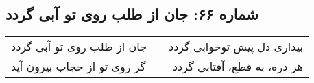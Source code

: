 \begin{center}
\section*{شماره ۶۶: جان از طلب روی تو آبی گردد}
\label{sec:066}
\begin{longtable}{l p{0.5cm} r}
جان از طلب روی تو آبی گردد
&&
بیداری دل پیش توخوابی گردد
\\
گر روی تو از حجاب بیرون آید
&&
هر ذره، به قطع، آفتابی گردد
\\
\end{longtable}
\end{center}
